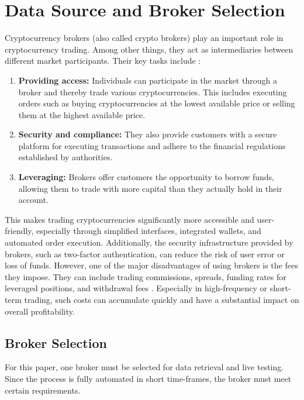 \section{Data Source and Broker Selection}
\label{chap:broker}

Cryptocurrency brokers (also called crypto brokers) play an important role in cryptocurrency trading.
Among other things, they act as intermediaries between different market participants.
Their key tasks include \cite{binance-broker}:

\begin{enumerate}
    \item \textbf{Providing access:} Individuals can participate in the market through a broker and thereby trade various cryptocurrencies.
    This includes executing orders such as buying cryptocurrencies at the lowest available price or selling them at the highest available price.
    \item \textbf{Security and compliance:} They also provide customers with a secure platform for executing transactions and adhere to the financial regulations established by authorities.
    \item \textbf{Leveraging:} Brokers offer customers the opportunity to borrow funds, allowing them to trade with more capital than they actually hold in their account.
\end{enumerate}


\noindent
This makes trading cryptocurrencies significantly more accessible and user-friendly, especially through simplified interfaces, integrated wallets, and automated order execution.
Additionally, the security infrastructure provided by brokers, such as two-factor authentication, can reduce the risk of user error or loss of funds.
However, one of the major disadvantages of using brokers is the fees they impose.
They can include trading commissions, spreads, funding rates for leveraged positions, and withdrawal fees \cite{broker-investing}.
Especially in high-frequency or short-term trading, such costs can accumulate quickly and have a substantial impact on overall profitability.

\subsection{Broker Selection}
\label{chap:broker-selection}

For this paper, one broker must be selected for data retrieval and live testing.
Since the process is fully automated in short time-frames, the broker must meet certain requirements.

